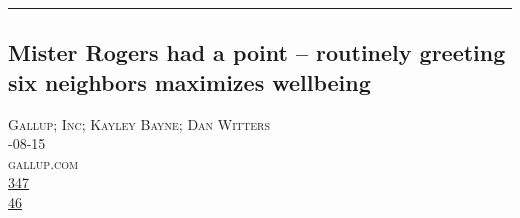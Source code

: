 \documentclass[10pt,a4paper]{article}
\begin{document}
\par\medskip
\noindent\textcolor{red}{\rule{\linewidth}{0.2mm}}

\subsection{Mister Rogers had a point – routinely greeting six neighbors maximizes wellbeing}
\noindent\begin{minipage}[t]{0.20\linewidth}
\vspace{0pt}
\noindent\textsc{\footnotesize
{\scriptsize\faUser}\space 
Gallup; Inc; Kayley Bayne; Dan Witters \\
{\scriptsize\faCalendar}-08-15 \\
{\scriptsize\faGlobe}\space 
gallup.com \\
{\scriptsize\faThumbsOUp}\space 
\href{http://news.ycombinator.com/item?id=37175432\&utm\_term=comment}{347} \\
{\scriptsize\faComments}\space 
\href{http://news.ycombinator.com/item?id=37175432\&utm\_term=comment}{46} \\
}
\end{minipage} %
\end{document}
